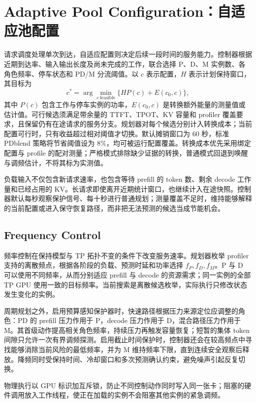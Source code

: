 \section{Adaptive Pool Configuration：自适应池配置}
请求调度处理单次到达，自适应配置则决定后续一段时间的服务能力。控制器根据近期到达率、输入输出长度及尚未完成的工作，联合选择 P、D、M 实例数、各角色频率、停车状态和 PD/M 分流阈值。以 $c$ 表示配置，$H$ 表示计划保持窗口，其目标为
\begin{equation}
 c^*=\arg\min_{c\ \mathrm{feasible}}
       \{H P(c)+E(c_0,c)\},
 \label{eq:pool-objective}
\end{equation}
其中 $P(c)$ 包含工作与停车实例的功率，$E(c_0,c)$ 是转换额外能量的测量值或估计值。可行候选须满足带余量的 TTFT、TPOT、KV 容量和 profiler 覆盖要求，且保留仍有在途请求的服务分支。规划器对每个候选分别计入转换成本；当前配置可行时，只有收益超过相对阈值才切换。默认摊销窗口为 $60$ 秒，标准 PDblend 策略将节省阈值设为 $8\%$，均可被运行配置覆盖。转换成本优先采用绑定配置与 profile 的配对测量；严格模式排除缺少证据的转换，普通模式回退到唤醒与调频估计，不将其标为实测值。

负载输入不仅包含新请求速率，也包含等待 prefill 的 token 数、剩余 decode 工作量和已经占用的 KV。长请求即使离开近期统计窗口，也继续计入在途快照。控制器默认每秒观察保护信号、每十秒进行普通规划；测量覆盖不足时，维持能够解释的当前配置或进入保守恢复路径，而非把无法预测的候选当成节能机会。

\subsection{Frequency Control}
频率控制在保持模型与 TP 拓扑不变的条件下改变服务速率。规划器枚举 profiler 支持的离散频点，根据各阶段的负载、预测时延和功率选择 $f_P,f_D,f_M$。P 与 D 可以使用不同频率，从而分别适应 prefill 与 decode 的资源需求；同一实例的全部 TP GPU 使用一致的目标频率。当前搜索是离散候选枚举，实际执行只修改状态发生变化的实例。

周期规划之外，启用预算感知保护器时，快速路径根据压力来源定位应调整的角色：PD 的 prefill 压力作用于 P，decode 压力作用于 D，混合路径压力作用于 M。其首级动作提高相关角色频率，持续压力再触发容量恢复；短暂的集体 token 间隙只允许一次有界调频探测。启用截止时间保护时，控制器还会在较高频点中寻找能够消除当前风险的最低频率，并为 M 维持频率下限，直到连续安全观察后释放。降频同时受保持时间、冷却窗口和多次预测确认约束，避免噪声引起反复切换。

物理执行以 GPU 标识加互斥锁，防止不同控制动作同时写入同一张卡；阻塞的硬件调用放入工作线程，使正在加载的实例不会阻塞其他实例的紧急调频。

